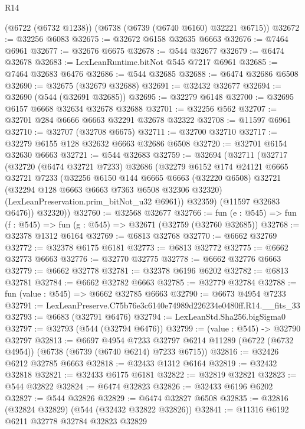 \begin{lexlean}{R14}
\begin{coremodule}
    (@6722 (@6732 @1238))
    (@6738 (@6739 (@6740 @6160) @32221 @6715))
@32672 := @32256 @6083
@32675 := @32672 @6158 @32635 @6663
@32676 := @7464 @6961
@32677 := @32676 @6675
@32678 := @544 @32677
@32679 := @6474 @32678
@32683 := LexLeanRuntime.bitNot @545 @7217 @6961
@32685 := @7464 @32683 @6476
@32686 := @544 @32685
@32688 := @6474 @32686 @6508
@32690 := @32675 (@32679 @32688)
@32691 := @32432 @32677
@32694 := @32690 (@544 (@32691 @32685))
@32695 := @32279 @6148
@32700 := @32695 @6157 @6668 @32634 @32678 @32688
@32701 := @32256 @562
@32707 := @32701 @284 @6666 @6663 @32291 @32678 @32322
@32708 := @11597 @6961
@32710 := @32707 (@32708 @6675)
@32711 := @32700 @32710
@32717 := @32279 @6155 @128 @32632 @6663 @32686 @6508
@32720 := @32701 @6154 @32630 @6663
@32721 := @544 @32683
@32759 := @32694
    (@32711
      (@32717
        (@32720
          (@6474 @32721 @7233)
          @32686
          (@32279
            @6152
            @174
            @24121
            @6665
            @32721
            @7233
            (@32256
              @6150
              @144
              @6665
              @6663
              (@32220 @6508)
              @32721
              (@32294 @128 @6663 @6663 @7363 @6508 @32306 @32320)
              (LexLeanPreservation.prim_bitNot_u32 @6961))
            @32359)
          (@11597 @32683 @6476))
        @32320))
@32760 := @32568 @32677
@32766 := fun (e : @545) => fun (f : @545) => fun (g : @545) => @32671 (@32759 (@32760 @32685))
@32768 := @32378 @1312 @6164
@32769 := @6813 @32768
@32770 := @6662 @32769
@32772 := @32378 @6175 @6181
@32773 := @6813 @32772
@32775 := @6662 @32773 @6663
@32776 := @32770 @32775
@32778 := @6662 @32776 @6663
@32779 := @6662 @32778
@32781 := @32378 @6196 @6202
@32782 := @6813 @32781
@32784 := @6662 @32782 @6663
@32785 := @32779 @32784
@32788 := fun (value : @545) => @6662 @32785 @6663
@32790 := @6673 @4954 @7233
@32791 := LexLeanPreserve.C75b76e3c6140e74989d226234e0480ff.R14.__fits_33
@32793 := @6683 (@32791 @6476)
@32794 := LexLeanStd.Sha256.bigSigma0
@32797 := @32793 (@544 (@32794 @6476))
@32799 := (value : @545) -> @32790 @32797
@32813 := @6697
    @4954
    @7233
    @32797
    @6214
    @11289
    (@6722 (@6732 @4954))
    (@6738 (@6739 (@6740 @6214) @7233 @6715))
@32816 := @32426 @6212 @32785 @6663
@32818 := @32433 @1312 @6164
@32819 := @32432 @32818
@32821 := @32433 @6175 @6181
@32822 := @32819 @32821
@32823 := @544 @32822
@32824 := @6474 @32823
@32826 := @32433 @6196 @6202
@32827 := @544 @32826
@32829 := @6474 @32827 @6508
@32835 := @32816 (@32824 @32829) (@544 (@32432 @32822 @32826))
@32841 := @11316 @6192 @6211 @32778 @32784 @32823 @32829

\end{coremodule}
\end{lexlean}
